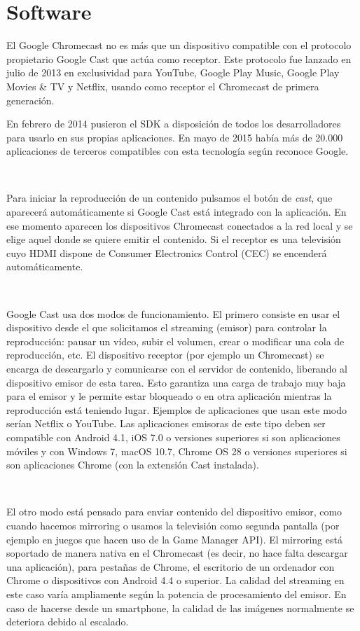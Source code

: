 \section{Software}

El Google Chromecast no es más que un dispositivo compatible con el protocolo propietario Google Cast que actúa como receptor.
Este protocolo fue lanzado en julio de 2013 en exclusividad para YouTube, Google Play Music, Google Play Movies \& TV y Netflix, usando como receptor el Chromecast de primera generación.

En febrero de 2014 pusieron el SDK a disposición de todos los desarrolladores para usarlo en sus propias aplicaciones.
En mayo de 2015 había más de 20.000 aplicaciones de terceros compatibles con esta tecnología según reconoce Google.

\

Para iniciar la reproducción de un contenido pulsamos el botón de \textit{cast}, que aparecerá automáticamente si Google Cast está integrado con la aplicación.
En ese momento aparecen los dispositivos Chromecast conectados a la red local y se elige aquel donde se quiere emitir el contenido.
Si el receptor es una televisión cuyo HDMI dispone de Consumer Electronics Control (CEC) se encenderá automáticamente.

\

Google Cast usa dos modos de funcionamiento. El primero consiste en usar el dispositivo desde el que solicitamos el streaming (emisor) para controlar la reproducción: pausar un vídeo, subir el volumen, crear o modificar una cola de reproducción, etc.
El dispositivo receptor (por ejemplo un Chromecast) se encarga de descargarlo y comunicarse con el servidor de contenido, liberando al dispositivo emisor de esta tarea.
Esto garantiza una carga de trabajo muy baja para el emisor y le permite estar bloqueado o en otra aplicación mientras la reproducción está teniendo lugar.
Ejemplos de aplicaciones que usan este modo serían Netflix o YouTube.
Las aplicaciones emisoras de este tipo deben ser compatible con Android 4.1, iOS 7.0 o versiones superiores si son aplicaciones móviles y con Windows 7, macOS 10.7, Chrome OS 28 o versiones superiores si son aplicaciones Chrome (con la extensión Cast instalada).

\

El otro modo está pensado para enviar contenido del dispositivo emisor, como cuando hacemos mirroring o usamos la televisión como segunda pantalla (por ejemplo en juegos que hacen uso de la Game Manager API).
El mirroring está soportado de manera nativa en el Chromecast (es decir, no hace falta descargar una aplicación), para pestañas de Chrome, el escritorio de un ordenador con Chrome o dispositivos con Android 4.4 o superior.
La calidad del streaming en este caso varía ampliamente según la potencia de procesamiento del emisor.
En caso de hacerse desde un smartphone, la calidad de las imágenes normalmente se deteriora debido al escalado.

